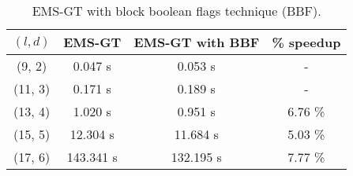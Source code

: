 \begin{table}[h] %
	\renewcommand{\arraystretch}{1.3}
	\centering
	\begin{tabular}{|c|c|c|c|}
	\hline 
	\bfseries\boldmath $(l,d)$ & 
	\bfseries\boldmath EMS-GT & 
	\bfseries\boldmath EMS-GT with BBF & 
	\bfseries \% speedup\\
	\hline
	(9, 2) & 0.047 s &		0.053 s 	&	- \\
	(11, 3) & 0.171 s &		0.189 s 	&	- \\
	(13, 4) & 1.020 s &		0.951 s 	&	6.76 \%\\
	(15, 5) & 12.304 s &	11.684 s  	&	5.03  \%\\
	(17, 6) & 143.341 s &	132.195 s 	&	7.77 \%\\
	\hline\end{tabular}
	
	\caption{EMS-GT with block boolean flags technique (BBF).}
	\label{tbl:ems-gt-bf-speedup}
\end{table}


